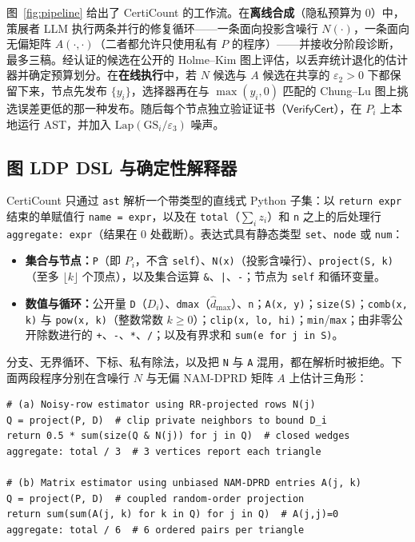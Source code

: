 \documentclass[11pt]{article}
\theoremstyle{ieeeitalic}
\newcommand{\GS}{\mathrm{GS}}
\newcommand{\dhatmax}{\hat{d}_{\max}}
\newcommand{\Lap}{\mathrm{Lap}}
\newcommand{\VerifyCert}{\mathsf{VerifyCert}}
\begin{document}
图~\ref{fig:pipeline} 给出了 CertiCount 的工作流。在\textbf{离线合成}（隐私预算为 $0$）中，策展者 LLM 执行两条并行的修复循环——一条面向投影含噪行 $N(\cdot)$，一条面向无偏矩阵 $A(\cdot,\cdot)$（二者都允许只使用私有 $P$ 的程序）——并接收分阶段诊断，最多三稿。经认证的候选在公开的 Holme--Kim 图\cite{holme2002growing}上评估，以丢弃统计退化的估计器并确定预算划分。在\textbf{在线执行}中，若 $N$ 候选与 $A$ 候选在共享的 $\varepsilon_2 > 0$ 下都保留下来，节点先发布 $\{y_i\}$，选择器再在与 $\max(y_i,0)$ 匹配的 Chung--Lu 图\cite{chung2002connected}上挑选误差更低的那一种发布。随后每个节点独立验证证书（$\VerifyCert$），在 $P_i$ 上本地运行 AST，并加入 $\Lap(\GS_i/\varepsilon_3)$ 噪声。

\subsection{图 LDP DSL 与确定性解释器}
\label{sec:dsl}

CertiCount 只通过 \texttt{ast} 解析一个带类型的直线式 Python 子集：以 \texttt{return expr} 结束的单赋值行 \texttt{name = expr}，以及在 \texttt{total}（$\sum_i z_i$）和 \texttt{n} 之上的后处理行 \texttt{aggregate: expr}（结果在 $0$ 处截断）。表达式具有静态类型 \texttt{set}、\texttt{node} 或 \texttt{num}：
\begin{itemize}
    \item \textbf{集合与节点：}\texttt{P}（即 $P_i$，不含 \texttt{self}）、\texttt{N(x)}（投影含噪行）、\texttt{project(S, k)}（至多 $\lfloor k \rfloor$ 个顶点），以及集合运算 \texttt{\&}、\texttt{|}、\texttt{-}；节点为 \texttt{self} 和循环变量。
    \item \textbf{数值与循环：}公开量 \texttt{D}（$D_i$）、\texttt{dmax}（$\dhatmax$）、\texttt{n}；\texttt{A(x, y)}；\texttt{size(S)}；\texttt{comb(x, k)} 与 \texttt{pow(x, k)}（整数常数 $k \ge 0$）；\texttt{clip(x, lo, hi)}；\texttt{min}/\texttt{max}；由非零公开除数进行的 \texttt{+}、\texttt{-}、\texttt{*}、\texttt{/}；以及有界求和 \texttt{sum(e for j in S)}。
\end{itemize}
分支、无界循环、下标、私有除法，以及把 \texttt{N} 与 \texttt{A} 混用，都在解析时被拒绝。下面两段程序分别在含噪行 $N$ 与无偏 NAM-DPRD 矩阵 $A$ 上估计三角形：
{
\begin{lstlisting}[style=dslstyle]
# (a) Noisy-row estimator using RR-projected rows N(j)
Q = project(P, D)  # clip private neighbors to bound D_i
return 0.5 * sum(size(Q & N(j)) for j in Q)  # closed wedges
aggregate: total / 3  # 3 vertices report each triangle

# (b) Matrix estimator using unbiased NAM-DPRD entries A(j, k)
Q = project(P, D)  # coupled random-order projection
return sum(sum(A(j, k) for k in Q) for j in Q)  # A(j,j)=0
aggregate: total / 6  # 6 ordered pairs per triangle
\end{lstlisting}
}
\end{document}
